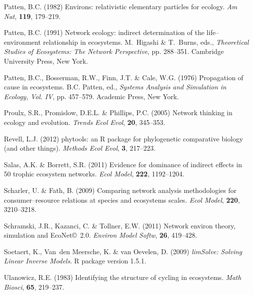 \documentclass[11pt]{article}
\begin{document}
\begin{thebibliography}{75}
Patten, B.C. (1982) Environs: relativistic elementary particles for ecology.
\newblock \emph{Am Nat}, \textbf{119}, 179--219.

Patten, B.C. (1991) Network ecology: indirect determination of the
  life--environment relationship in ecosystems.
\newblock M.~Higashi \& T.~Burns, eds., \emph{Theoretical Studies of
  Ecosystems: The Network Perspective}, pp. 288--351. Cambridge University
  Press, New York.

Patten, B.C., Bosserman, R.W., Finn, J.T. \& Cale, W.G. (1976) Propagation of
  cause in ecosystems.
\newblock B.C. Patten, ed., \emph{Systems Analysis and Simulation in Ecology,
  Vol. IV}, pp. 457--579. Academic Press, New York.

Proulx, S.R., Promislow, D.E.L. \& Phillips, P.C. (2005) Network thinking in
  ecology and evolution.
\newblock \emph{Trends Ecol Evol}, \textbf{20}, 345--353.

Revell, L.J. (2012) phytools: an {R} package for phylogenetic comparative
  biology (and other things).
\newblock \emph{Methods Ecol Evol}, \textbf{3}, 217--223.

Salas, A.K. \& Borrett, S.R. (2011) Evidence for dominance of indirect effects
  in 50 trophic ecosystem networks.
\newblock \emph{Ecol Model}, \textbf{222}, 1192--1204.

Scharler, U. \& Fath, B. (2009) Comparing network analysis methodologies for
  consumer--resource relations at species and ecosystems scales.
\newblock \emph{Ecol Model}, \textbf{220}, 3210--3218.

Schramski, J.R., Kazanci, C. \& Tollner, E.W. (2011) Network environ theory,
  simulation and {EcoNet}\copyright\ 2.0.
\newblock \emph{Environ Model Softw}, \textbf{26}, 419--428.

Soetaert, K., Van~den Meersche, K. \& van Oevelen, D. (2009) \emph{limSolve:
  Solving Linear Inverse Models}.
\newblock R package version 1.5.1.

Ulanowicz, R.E. (1983) Identifying the structure of cycling in ecosystems.
\newblock \emph{Math Biosci}, \textbf{65}, 219--237.


\end{thebibliography}
\end{document}
